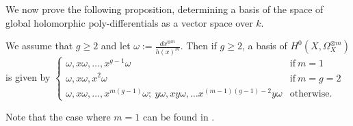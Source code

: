 We now prove the following proposition, determining a basis of the space of global holomorphic poly-differentials as a vector space over $k$.

    \begin{prop}
    We assume that $g\geq 2$ and let $\omega:= \frac{dx^{\otimes m}}{h(x)^m}$. 
    Then if $g\geq 2$, a basis of $H^0(X,\Omega_X^{\otimes m})$ is given by
        $\begin{cases}
        \omega, x\omega, \ldots , x^{g-1}\omega &  \mbox{if}\ m=1 \\
        \omega, x\omega, x^2\omega & \mbox{if}\ m=g=2 \\
        \omega, x\omega, \ldots, x^{m(g-1)}\omega;\  y\omega, xy\omega, \ldots x^{(m-1)(g-1)-2}y\omega & \mbox{otherwise.}
        \end{cases}$
    \end{prop}
    
    \begin{rem}
    Note that the case where $m=1$ can be found in \cite[Prop. 7.4.26]{liu}.
    \end{rem}

